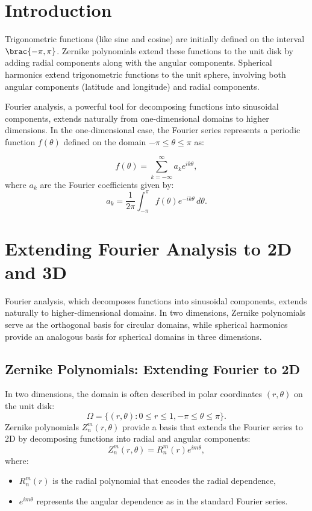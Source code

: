 % 
%
\section{Introduction}
Trigonometric functions (like sine and cosine) are initially defined on the interval $\brac{-\pi,\pi}$.
Zernike polynomials extend these functions to the unit disk by adding radial components along with the angular components.
Spherical harmonics extend trigonometric functions to the unit sphere, involving both angular components (latitude and longitude) and radial components.

Fourier analysis, a powerful tool for decomposing functions into sinusoidal components, extends naturally from one-dimensional domains to higher dimensions. In the one-dimensional case, the Fourier series represents a periodic function \( f(\theta) \) defined on the domain \( -\pi \leq \theta \leq \pi \) as:

\[
f(\theta) = \sum_{k=-\infty}^{\infty} a_k e^{i k \theta},
\]
where \( a_k \) are the Fourier coefficients given by:
\[
a_k = \frac{1}{2\pi} \int_{-\pi}^\pi f(\theta) e^{-i k \theta} \, d\theta.
\]

\section{Extending Fourier Analysis to 2D and 3D}

Fourier analysis, which decomposes functions into sinusoidal components, extends naturally to higher-dimensional domains. In two dimensions, Zernike polynomials serve as the orthogonal basis for circular domains, while spherical harmonics provide an analogous basis for spherical domains in three dimensions. 

\subsection{Zernike Polynomials: Extending Fourier to 2D}

In two dimensions, the domain is often described in polar coordinates \((r, \theta)\) on the unit disk:
\[
\Omega = \{(r, \theta) : 0 \leq r \leq 1, -\pi \leq \theta \leq \pi\}.
\]
Zernike polynomials \( Z_n^m(r, \theta) \) provide a basis that extends the Fourier series to 2D by decomposing functions into radial and angular components:
\[
Z_n^m(r, \theta) = R_n^m(r) e^{i m \theta},
\]
where:
\begin{itemize}
    \item \( R_n^m(r) \) is the radial polynomial that encodes the radial dependence,
    \item \( e^{i m \theta} \) represents the angular dependence as in the standard Fourier series.
\end{itemize}

